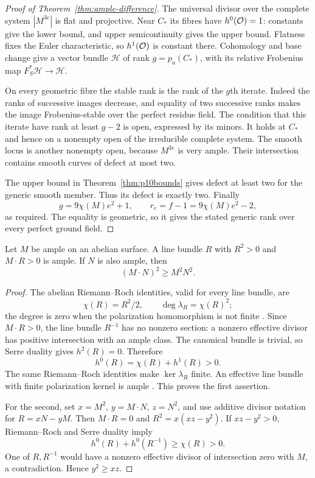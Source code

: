 \begin{proof}[Proof of Theorem~\ref{thm:ample-difference}]
The universal divisor over the complete system $|M^{3e}|$ is flat and projective. Near $C_*$ its fibres have $h^0(\mathcal O)=1$: constants give the lower bound, and upper semicontinuity gives the upper bound. Flatness fixes the Euler characteristic, so $h^1(\mathcal O)$ is constant there. Cohomology and base change give a vector bundle $\mathcal H$ of rank $g=p_a(C_*)$, with its relative Frobenius map $F_S^*\mathcal H\to\mathcal H$.

On every geometric fibre the stable rank is the rank of the $g$th iterate. Indeed the ranks of successive images decrease, and equality of two successive ranks makes the image Frobenius-stable over the perfect residue field. The condition that this iterate have rank at least $g-2$ is open, expressed by its minors. It holds at $C_*$ and hence on a nonempty open of the irreducible complete system. The smooth locus is another nonempty open, because $M^{3e}$ is very ample. Their intersection contains smooth curves of defect at most two.

The upper bound in Theorem~\ref{thm:p10bounds} gives defect at least two for the generic smooth member. Thus its defect is exactly two. Finally
\[
 g=9\chi(M)e^2+1,\qquad r_e=f-1=9\chi(M)e^2-2,
\]
as required. The equality is geometric, so it gives the stated generic rank over every perfect ground field.
\end{proof}

\begin{lemma}\label{lem:ample-positive-square}
Let $M$ be ample on an abelian surface. A line bundle $R$ with $R^2>0$ and $M\cdot R>0$ is ample. If $N$ is also ample, then
\[
                         (M\cdot N)^2\ge M^2N^2.
\]
\end{lemma}
\begin{proof}
The abelian Riemann--Roch identities, valid for every line bundle, are
\[
 \chi(R)=R^2/2,\qquad \deg\lambda_R=\chi(R)^2;
\]
the degree is zero when the polarization homomorphism is not finite \citep[Theorem~9.11 and proof, pp.~131--133]{EGM}. Since $M\cdot R>0$, the line bundle $R^{-1}$ has no nonzero section: a nonzero effective divisor has positive intersection with an ample class. The canonical bundle is trivial, so Serre duality gives $h^2(R)=0$. Therefore
\[
                     h^0(R)=\chi(R)+h^1(R)>0.
\]
The same Riemann--Roch identities make $\ker\lambda_R$ finite. An effective line bundle with finite polarization kernel is ample \citep[Proposition~2.22 and proof, p.~25; Lemma~2.21, pp.~24--25]{EGM}. This proves the first assertion.

For the second, set $x=M^2$, $y=M\cdot N$, $z=N^2$, and use additive divisor notation for $R=xN-yM$. Then $M\cdot R=0$ and $R^2=x(xz-y^2)$. If $xz-y^2>0$, Riemann--Roch and Serre duality imply
\[
                   h^0(R)+h^0(R^{-1})\ge\chi(R)>0.
\]
One of $R,R^{-1}$ would have a nonzero effective divisor of intersection zero with $M$, a contradiction. Hence $y^2\ge xz$.
\end{proof}

